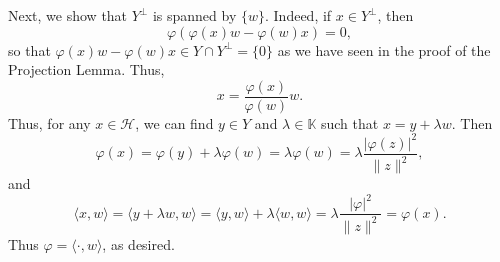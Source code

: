 \documentclass[11pt]{article}
\theoremstyle{thmstyle}
\theoremstyle{defstyle}
\newcommand{\R}{\mathbb{R}}
\newcommand{\bbC}{\mathbb{C}}
\newcommand{\K}{\mathbb{K}} %
\newcommand{\calH}{\mathcal{H}}
\begin{document}
Next, we show that $Y^\perp$ is spanned by $\{w\}$. Indeed, if $x\in Y^\perp$, then 
\begin{equation*}
    \varphi\left(\varphi(x)w - \varphi(w)x\right) = 0,
\end{equation*}
so that $\varphi(x)w - \varphi(w)x\in Y\cap Y^\perp = \{0\}$ as we have seen in the proof of the Projection Lemma. Thus, 
\begin{equation*}
    x = \frac{\varphi(x)}{\varphi(w)}w.
\end{equation*}
Thus, for any $x\in\calH$, we can find $y\in Y$ and $\lambda\in\K$ such that $x = y + \lambda w$. Then 
\begin{equation*}
    \varphi(x) = \varphi(y) + \lambda\varphi(w) = \lambda\varphi(w) = \lambda\frac{|\varphi(z)|^2}{\|z\|^2},
\end{equation*}
and 
\begin{equation*}
    \langle x, w\rangle = \langle y + \lambda w, w\rangle = \langle y, w\rangle + \lambda\langle w, w\rangle = \lambda\frac{|\varphi|^2}{\|z\|^2} = \varphi(x).
\end{equation*}
Thus $\varphi = \langle\cdot, w\rangle$, as desired.
\end{document}
